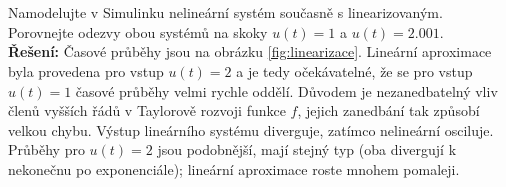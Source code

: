 \documentclass[twoside]{article}
\begin{document}
\subsection{~}
Namodelujte v Simulinku nelineární systém současně s linearizovaným. Porovnejte odezvy obou systémů
na skoky $u(t) = 1$ a $u(t) = 2.001$. \\
\textbf{Řešení:} Časové průběhy jsou na obrázku \ref{fig:linearizace}. Lineární aproximace byla provedena pro vstup $u(t) = 2$ a je tedy očekávatelné, že se pro vstup $u(t) = 1$
časové průběhy velmi rychle oddělí. Důvodem je nezanedbatelný vliv členů vyšších řádů v Taylorově rozvoji funkce $f$, jejich zanedbání tak způsobí velkou chybu.
Výstup lineárního systému diverguje, zatímco nelineární osciluje. Průběhy pro $u(t) = 2$ jsou podobnější, mají stejný typ (oba divergují k nekonečnu po exponenciále);
lineární aproximace roste mnohem pomaleji.
\end{document}
